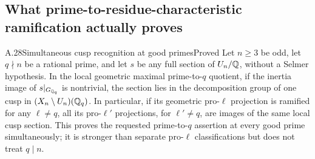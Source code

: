 \subsection{What prime-to-residue-characteristic ramification actually proves}

\begin{statement}{A.28}{Simultaneous cusp recognition at good primes}{Proved}
Let $n\ge3$ be odd, let $q\nmid n$ be a rational prime, and let $s$ be any full section of $U_n/\mathbb Q$, without a Selmer hypothesis. In the local geometric maximal prime-to-$q$ quotient, if the inertia image of $s|_{G_{\mathbb Q_q}}$ is nontrivial, the section lies in the decomposition group of one cusp in $(X_n\setminus U_n)(\mathbb Q_q)$. In particular, if its geometric pro-$\ell$ projection is ramified for any $\ell\ne q$, all its pro-$\ell'$ projections, for $\ell'\ne q$, are images of the same local cusp section. This proves the requested prime-to-$q$ assertion at every good prime simultaneously; it is stronger than separate pro-$\ell$ classifications but does not treat $q\mid n$.
\end{statement}
